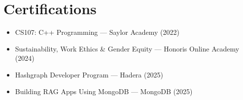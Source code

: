 \documentclass[11pt,a4paper]{article}
\begin{document}
\section*{Certifications}
\begin{itemize}[leftmargin=12pt,itemsep=2pt]
  \item CS107: C++ Programming — Saylor Academy (2022)
  \item Sustainability, Work Ethics \& Gender Equity — Honoris Online Academy (2024)
  \item Hashgraph Developer Program — Hadera (2025)
  \item Building RAG Apps Using MongoDB — MongoDB (2025)
\end{itemize}
\end{document}
